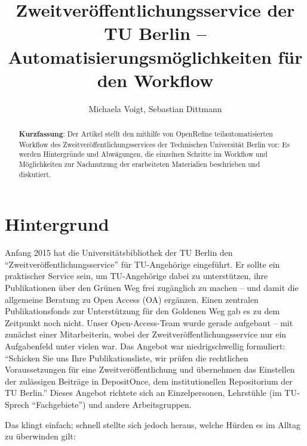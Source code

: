 \documentclass[a4paper,
fontsize=11pt,
oneside,
numbers=noperiodatend,
parskip=half-,
bibliography=totoc,
final
]{scrartcl}
\title{\LARGE{Zweitveröffentlichungsservice der TU Berlin – Automatisierungsmöglichkeiten für den Workflow}}%
\author{Michaela Voigt, Sebastian Dittmann} %
\date{}
\begin{document}
\maketitle
\thispagestyle{fancyplain} 

\begin{abstract}
\noindent\textbf{Kurzfassung}: Der Artikel stellt den mithilfe von OpenRefine
teilautomatisierten Workflow des Zweitveröffentlichungsservices der
Technischen Universität Berlin vor: Es werden Hintergründe und
Abwägungen, die einzelnen Schritte im Workflow und Möglichkeiten zur
Nachnutzung der erarbeiteten Materialien beschrieben und diskutiert.
\end{abstract}

\hypertarget{hintergrund}{%
\section{Hintergrund}\label{hintergrund}}

Anfang 2015 hat die Universitätsbibliothek der TU Berlin den
\enquote{Zweitveröffentlichungsservice} für TU-Angehörige eingeführt. Er
sollte ein praktischer Service sein, um TU-Angehörige dabei zu
unterstützen, ihre Publikationen über den Grünen Weg frei zugänglich zu
machen -- und damit die allgemeine Beratung zu Open Access (OA)
ergänzen. Einen zentralen Publikationsfonds zur Unterstützung für den
Goldenen Weg gab es zu dem Zeitpunkt noch nicht. Unser Open-Access-Team
wurde gerade aufgebaut -- mit zunächst einer Mitarbeiterin, wobei der
Zweitveröffentlichungsservice nur ein Aufgabenfeld unter vielen war. Das
Angebot war niedrigschwellig formuliert: \enquote{Schicken Sie uns Ihre
Publikationsliste, wir prüfen die rechtlichen Voraussetzungen für eine
Zweitveröffentlichung und übernehmen das Einstellen der zulässigen
Beiträge in DepositOnce, dem institutionellen Repositorium der TU
Berlin.} Dieses Angebot richtete sich an Einzelpersonen, Lehrstühle (im
TU-Sprech \enquote{Fachgebiete}) und andere Arbeitsgruppen.

Das klingt einfach; schnell stellte sich jedoch heraus, welche Hürden es
im Alltag zu überwinden gilt:
\end{document}
